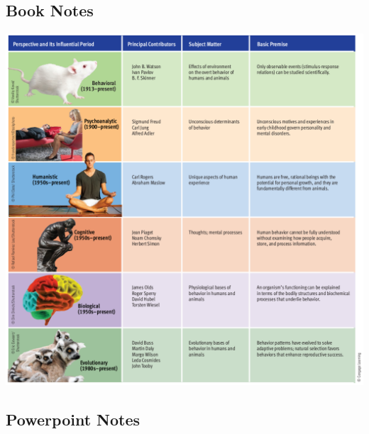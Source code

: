 \documentclass{article}
\begin{document}
\subsection{Book Notes}
\begin{center}
    \includegraphics[width=\textwidth]{types.png}
\end{center}

\subsection{Powerpoint Notes}

\end{document}
